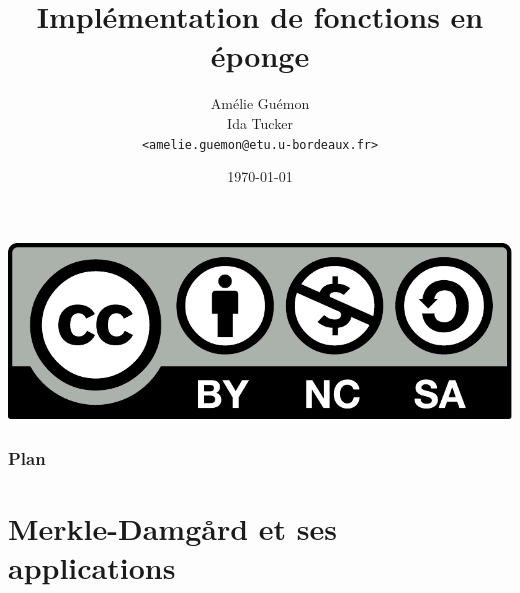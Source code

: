 %
%

\usepackage[french]{babel}

\newcommand{\highlight}[1]{\textcolor{structure.fg}{\bfseries #1}}

\title{Implémentation de fonctions en éponge}

\author[Amélie Guémon\\Ida Tucker]{Amélie Guémon\\Ida Tucker\\[-.25em]
\texttt{\scriptsize <amelie.guemon@etu.u-bordeaux.fr>}\\}


\date{\today}



\begin{frame}
  \vspace{3.5em}
  \titlepage

  \begin{center}
    \includegraphics[scale=.2]{cc-by-nc-sa.pdf}
  \end{center}
\end{frame}

\begin{frame}
  \frametitle{Plan}
  \tableofcontents[subsectionstyle=hide]
\end{frame}


\section{Merkle-Damg\r{a}rd et ses applications}

